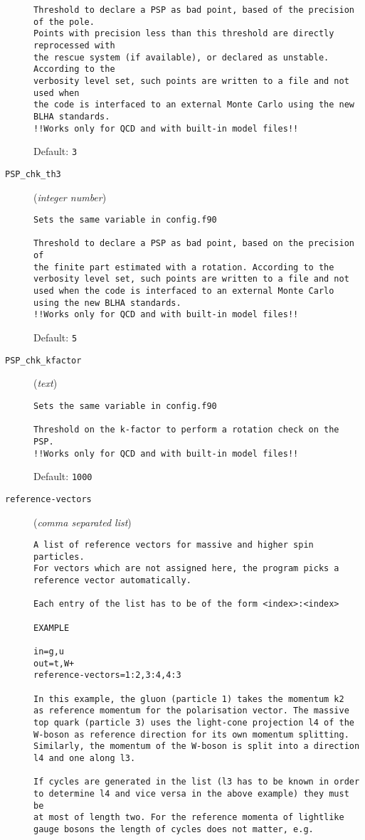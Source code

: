 \begin{description}
\begin{verbatim}
Threshold to declare a PSP as bad point, based of the precision of the pole.
Points with precision less than this threshold are directly reprocessed with
the rescue system (if available), or declared as unstable. According to the
verbosity level set, such points are written to a file and not used when
the code is interfaced to an external Monte Carlo using the new BLHA standards.
!!Works only for QCD and with built-in model files!!
\end{verbatim}
Default: \verb|3|
\item[\texttt{PSP\_chk\_th3}] (\textit{integer number})
\begin{verbatim}
Sets the same variable in config.f90

Threshold to declare a PSP as bad point, based on the precision of
the finite part estimated with a rotation. According to the
verbosity level set, such points are written to a file and not
used when the code is interfaced to an external Monte Carlo
using the new BLHA standards.
!!Works only for QCD and with built-in model files!!
\end{verbatim}
Default: \verb|5|
\item[\texttt{PSP\_chk\_kfactor}] (\textit{text})
\begin{verbatim}
Sets the same variable in config.f90

Threshold on the k-factor to perform a rotation check on the PSP.
!!Works only for QCD and with built-in model files!!
\end{verbatim}
Default: \verb|1000|
\item[\texttt{reference-vectors}] (\textit{comma separated list})
\begin{verbatim}
A list of reference vectors for massive and higher spin particles.
For vectors which are not assigned here, the program picks a
reference vector automatically.

Each entry of the list has to be of the form <index>:<index>

EXAMPLE

in=g,u
out=t,W+
reference-vectors=1:2,3:4,4:3

In this example, the gluon (particle 1) takes the momentum k2
as reference momentum for the polarisation vector. The massive
top quark (particle 3) uses the light-cone projection l4 of the
W-boson as reference direction for its own momentum splitting.
Similarly, the momentum of the W-boson is split into a direction
l4 and one along l3.

If cycles are generated in the list (l3 has to be known in order
to determine l4 and vice versa in the above example) they must be
at most of length two. For the reference momenta of lightlike
gauge bosons the length of cycles does not matter, e.g.


\end{verbatim}
\end{description}
